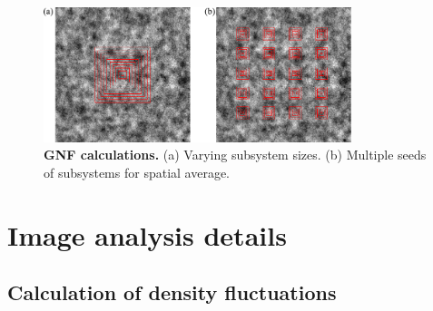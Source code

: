 \documentclass[twocolumn,aps,prx,amsmath,amssymb,longbibliography]{revtex4-2}
\begin{document}
\begin{figure}[!]
\begin{center}
\includegraphics[width=0.8\textwidth]{figures/GNF-calculation/v1.pdf}
\caption[GNF calculations]
{
\textbf{GNF calculations.}
(a) Varying subsystem sizes.
(b) Multiple seeds of subsystems for spatial average.
}
\label{GNF-calculation}
\end{center}
\end{figure}


\section{Image analysis details}
\subsection{Calculation of density fluctuations}
\end{document}
